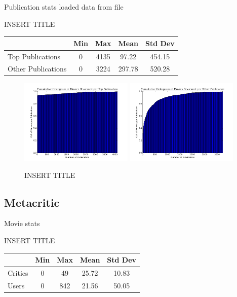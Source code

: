 \documentclass[12pt]{article}
\begin{document}
Publication stats
loaded data from file
\begin{table}[H]
 \centering
 INSERT TITLE \\
 \begin{tabular}{| l | c | c | c | c |}
 \hline
 &  Min & Max & Mean & Std Dev  \\
 \hline
 Top Publications & 0 & 4135 & 97.22 & 454.15 \\
 Other Publications & 0 & 3224 & 297.78 & 520.28 \\
 \hline
 \end{tabular}
 \end{table}

 \begin{figure}[H]
    \centering
    \includegraphics[width=0.48\textwidth]{plots/plot_r_pub_top.png}
    \includegraphics[width=0.48\textwidth]{plots/plot_r_pub_oth.png}
    \caption{INSERT TITLE}
    \label{fig:r_pub}
\end{figure}




\subsection{Metacritic}

Movie stats
\begin{table}[H]
 \centering
 INSERT TITLE \\
 \begin{tabular}{| l | c | c | c | c |}
 \hline
 &  Min & Max & Mean & Std Dev  \\
 \hline
 Critics & 0 & 49 & 25.72 & 10.83 \\
 Users & 0 & 842 & 21.56 & 50.05 \\
 \hline
 \end{tabular}
 \end{table}
\end{document}
